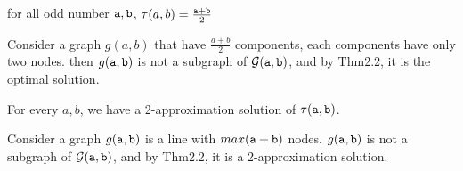 \begin{corollary}
for all odd number $\mathtt{a},\mathtt{b}$, $\tau(a,b)=\frac{\mathtt{a}+\mathtt{b}}{2}$
\end{corollary}

Consider a graph  $g(a,b)$ that have  $\frac{a+b}{2}$ components, each components have only two nodes. then  $g(\mathtt{a},\mathtt{b})$ is not a subgraph of  ${\cal G}(\mathtt{a},\mathtt{b})$, and by Thm2.2, it is the optimal solution.

\begin{theorem} 
For every $a,b$, we have a 2-approximation solution of  $\tau(\mathtt{a},\mathtt{b})$.
\end{theorem}
Consider a graph  $g(\mathtt{a},\mathtt{b})$ is a line with $max(\mathtt{a}+\mathtt{b})$ nodes.  $g(\mathtt{a},\mathtt{b})$ is not a subgraph of  ${\cal G}(\mathtt{a},\mathtt{b})$, and by Thm2.2, it is a 2-approximation solution.
